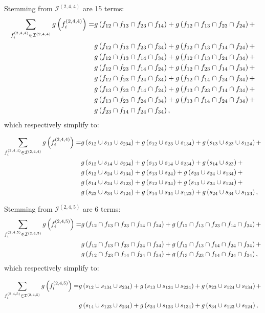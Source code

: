 \documentclass[11pt]{article}
\newcommand{\gxn}[1]{g\left(#1\right)}
\newcommand{\fn}[1]{f^{(#1)}}
\newcommand{\ints}[1]{\mathcal{I}^{(#1)}}
\begin{document}
Stemming from $\ints{2,4,4}$ are 15 terms:
\begin{align}
	\sum_{\fn{2,4,4}_i\in\ints{2,4,4}}\gxn{\fn{2,4,4}_i} =
	  & \gxn{\IDiDjDkDl} + \gxn{\IDiDjDkDm} + \nonumber\\
	  & \gxn{\IDiDjDkDn} + \gxn{\IDiDjDlDm} + \nonumber\\
	  & \gxn{\IDiDjDlDn} + \gxn{\IDiDjDmDn} + \nonumber\\
	  & \gxn{\IDiDkDlDm} + \gxn{\IDiDkDlDn} + \nonumber\\
	  & \gxn{\IDiDkDmDn} + \gxn{\IDiDlDmDn} + \nonumber\\
	  & \gxn{\IDjDkDlDm} + \gxn{\IDjDkDlDn} + \nonumber\\
	  & \gxn{\IDjDkDmDn} + \gxn{\IDjDlDmDn} + \nonumber\\
	  & \gxn{\IDkDlDmDn},
\end{align}
which respectively simplify to:

\begin{align}
	\sum_{\fn{2,4,4}_i\in\ints{2,4,4}}\gxn{\fn{2,4,4}_i} =
	& \gxn{\Ii\cup\Ij\cup\Ill} + \gxn{\Ii\cup\Ik\cup\Ikk} + 
	  \gxn{\Ij\cup\Ik\cup\Ijj} + \nonumber\\
	& \gxn{\Ii\cup\Il\cup\Ill} + \gxn{\Ij\cup\Il\cup\Ill} +
	  \gxn{\Il\cup\Ik} + \nonumber\\
	& \gxn{\Ii\cup\In\cup\Ikk} + \gxn{\Ij\cup\In} + 
	  \gxn{\Ik\cup\In\cup\Ikk} + \nonumber\\
	& \gxn{\Il\cup\In\cup\Iii} + \gxn{\Ii\cup\Io} +
	  \gxn{\Ij\cup\Io\cup\Ijj} + \nonumber\\
	& \gxn{\Ik\cup\Io\cup\Ijj} + \gxn{\Il\cup\Io\cup\Iii} +
	  \gxn{\In\cup\Io\cup\Iii},
\end{align}

Stemming from $\ints{2,4,5}$ are 6 terms:
\begin{align}
	\sum_{\fn{2,4,5}_i\in\ints{2,4,5}}\gxn{\fn{2,4,5}_i} =
 	  & \gxn{\IDiDjDkDlDm} + \gxn{\IDiDjDkDlDn} + \nonumber\\
	  & \gxn{\IDiDjDkDmDn} + \gxn{\IDiDjDlDmDn} + \nonumber\\
	  & \gxn{\IDiDkDlDmDn} + \gxn{\IDjDkDlDmDn},
\end{align}
which respectively simplify to:	  

\begin{align}
	\sum_{\fn{2,4,5}_i\in\ints{2,4,5}}\gxn{\fn{2,4,5}_i} =
	& \gxn{\Ii\cup\Ikk\cup\Ill} + \gxn{\Ij\cup\Ijj\cup\Ill} + 
	  \gxn{\Ik\cup\Ijj\cup\Ikk} + \nonumber\\
	& \gxn{\Il\cup\Iii\cup\Ill} + \gxn{\In\cup\Iii\cup\Ikk} + 
	  \gxn{\Io\cup\Iii\cup\Ijj},
\end{align}
\end{document}
